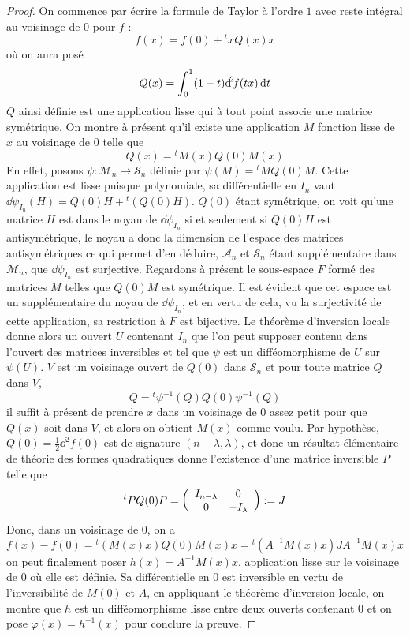\begin{proof}
    On commence par écrire la formule de Taylor à l'ordre $1$ avec reste intégral au voisinage 
    de $0$ pour $f$ :
    \[
        f(x)=f(0)+{}^txQ(x)x
    \]
    où on aura posé 
    \[
        Q(x)=\int_0^1(1-t){\operatorname{d}\hskip-1.5pt}^{2}\hskip-1.5ptf(tx)\operatorname{d}\hskip-1.5pt t
    \]
    $Q$ ainsi définie est une application lisse qui à tout point associe une matrice symétrique.
    On montre à présent qu'il existe une application $M$ fonction lisse de $x$ au voisinage de 
    $0$ telle que 
    \[
        Q(x)={}^tM(x)Q(0)M(x)
    \]
    En effet, posons $\psi:\mathcal M_n\to \mathcal S_n$ définie par $\psi(M)={}^tMQ(0)M$.
    Cette application est lisse puisque polynomiale, sa différentielle en $I_n$ vaut 
    $\dd\psi_{I_n}(H)=Q(0)H+{}^t(Q(0)H)$.
    $Q(0)$ étant symétrique, on voit qu'une matrice $H$ est dans le noyau de $\dd\psi_{I_n}$ 
    si et seulement si $Q(0)H$ est antisymétrique, le noyau a donc la dimension de l'espace 
    des matrices antisymétriques ce qui permet d'en  déduire, $\mathcal A_n$ et $\mathcal S_n$ 
    étant supplémentaire dans $\mathcal M_n$, que $\dd\psi_{I_n}$ est surjective.
    Regardons à présent le sous-espace $F$ formé des matrices $M$ telles que $Q(0)M$ est 
    symétrique. 
    Il est évident que cet espace est un supplémentaire du noyau de $\dd\psi_{I_n}$, et en 
    vertu de cela, vu la surjectivité de cette application,  sa restriction à $F$ est bijective. 
    Le théorème d'inversion locale donne alors un ouvert $U$ contenant $I_n$ que l'on peut 
    supposer contenu dans l'ouvert des matrices inversibles et tel que $\psi$ est un 
    difféomorphisme de $U$ sur $\psi(U)$. 
    $V$ est un voisinage ouvert de $Q(0)$ dans $\mathcal S_n$ et pour toute matrice $Q$ dans $V$,
    \[
        Q={}^t\psi^{-1}(Q)Q(0)\psi^{-1}(Q)
    \]
    il suffit à présent de prendre $x$ dans un voisinage de $0$ assez petit pour que $Q(x)$ 
    soit dans $V$, et alors on obtient $M(x)$ comme voulu.
    Par hypothèse, $Q(0)=\frac12\dd^2f(0)$ est de signature $(n-\lambda,\lambda)$, et donc un 
    résultat élémentaire de théorie des formes quadratiques donne l'existence d'une matrice 
    inversible $P$ telle que 
    \[
        {}^tPQ(0)P=
        \left(\begin{array}{c c} I_{n-\lambda} & 0\\ 0 & -I_{\lambda} \end{array}\right):=J
    \]
    Donc, dans un voisinage de $0$, on a 
    \[
        f(x)-f(0)={}^t(M(x)x)Q(0)M(x)x={}^t(A^{-1}M(x)x)JA^{-1}M(x)x
    \]
    on peut finalement poser $h(x)=A^{-1}M(x)x$, application lisse sur le voisinage de $0$ où 
    elle est définie. Sa différentielle en $0$ est inversible en vertu de l'inversibilité
    de $M(0)$ et $A$, en appliquant le théorème d'inversion locale, on montre que $h$ est un 
    difféomorphisme lisse entre deux ouverts contenant $0$ et on pose $\varphi(x)=h^{-1}(x)$ 
    pour conclure la preuve.
\end{proof}

